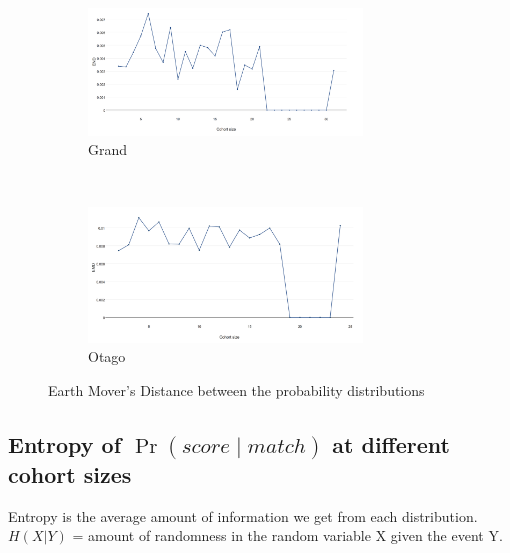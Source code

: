 \begin{figure}[htbp]
  \centering
  \begin{subfigure}[t]{\textwidth}
    \centering
    \includegraphics[width=0.8\textwidth]{dataset/grand/emd}
    \caption{Grand}
    \label{fig:grand_emd} %
  \end{subfigure}%
  \\
  \begin{subfigure}[t]{\textwidth}
    \centering
    \includegraphics[width=0.8\textwidth]{dataset/otago/emd}
    \caption{Otago}
    \label{fig:otago_emd} %
  \end{subfigure}%
  \caption{Earth Mover's Distance between the probability distributions}
  \label{fig:emdist} %
\end{figure}

\subsection{Entropy of $\Pr{(score \mid match)}$ at different cohort sizes}

Entropy is the average amount of information we get from each distribution.
$H(X|Y)$ = amount of randomness in the random variable X given the event Y.

